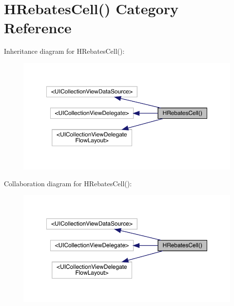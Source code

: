 \hypertarget{category_h_rebates_cell_07_08}{}\section{H\+Rebates\+Cell() Category Reference}
\label{category_h_rebates_cell_07_08}


Inheritance diagram for H\+Rebates\+Cell()\+:\nopagebreak
\begin{figure}[H]
\begin{center}
\leavevmode
\includegraphics[width=350pt]{category_h_rebates_cell_07_08__inherit__graph}
\end{center}
\end{figure}


Collaboration diagram for H\+Rebates\+Cell()\+:\nopagebreak
\begin{figure}[H]
\begin{center}
\leavevmode
\includegraphics[width=350pt]{category_h_rebates_cell_07_08__coll__graph}
\end{center}
\end{figure}
